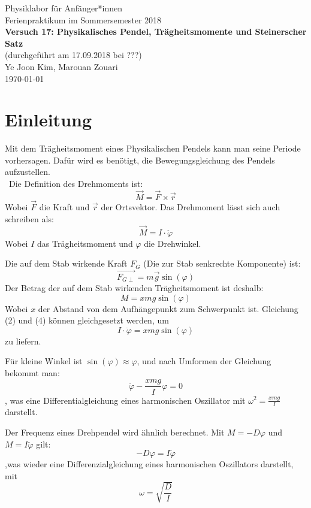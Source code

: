 \documentclass[11pt,a4paper]{article} %
\begin{document}
{
	\centering 
	\large 
	Physiklabor für Anfänger*innen \\
	Ferienpraktikum im Sommersemester 2018 \\[4mm]
	\textbf{\LARGE 
		Versuch 17: Physikalisches Pendel, Trägheitsmomente und Steinerscher Satz
	} \\[3mm]
	(durchgeführt am 17.09.2018 bei ???) \\
	Ye Joon Kim, Marouan Zouari\\
	\today \\[10mm]
}
\tableofcontents
\newpage
\section{Einleitung}
Mit dem Trägheitsmoment eines Physikalischen Pendels kann man seine Periode vorhersagen. Dafür wird es benötigt, die Bewegungsgleichung des Pendels aufzustellen. 
\\\
Die Definition des Drehmoments ist:
\begin{equation}
\vec{M} = \vec{F}\times \vec{r}
\end{equation}
Wobei $\vec{F}$ die Kraft und $\vec{r}$ der Ortsvektor. Das Drehmoment lässt sich auch schreiben als:
\begin{equation}
\vec{M} = I \cdot \ddot{\varphi}
\end{equation}
Wobei $I$ das Trägheitsmoment und $\varphi$ die Drehwinkel. 

Die auf dem Stab wirkende Kraft $F_G$ (Die zur Stab  senkrechte Komponente) ist:
\begin{equation}
\vec{F_{G\perp}} = m\vec{g}\sin(\varphi)
\end{equation}
Der Betrag der auf dem Stab wirkenden Trägheitsmoment ist deshalb:
\begin{equation}
M = xmg\sin(\varphi)
\end{equation}
Wobei $x$ der Abstand von dem Aufhängepunkt zum Schwerpunkt ist. Gleichung (2) und (4) können gleichgesetzt werden, um
$$ I \cdot \ddot{\varphi} = xmg\sin(\varphi)$$ 
zu liefern. 

Für kleine Winkel ist $\sin(\varphi) \approx \varphi$, und nach Umformen der Gleichung bekommt man:
$$ \ddot{\varphi} - \frac{xmg}{I} \varphi = 0$$
, was eine Differentialgleichung eines harmonischen Oszillator mit $\omega^2 = \frac{xmg}{I}$ darstellt. 

Der Frequenz eines Drehpendel wird ähnlich berechnet. Mit $M = -D\varphi$ und $M = I\ddot{\varphi}$ gilt:
$$-D\varphi = I\ddot{\varphi}$$
,was wieder eine Differenzialgleichung eines harmonischen Oszillators darstellt, mit 
\begin{equation}
\omega = \sqrt{\frac{D}{I}}
\end{equation}
\end{document}
